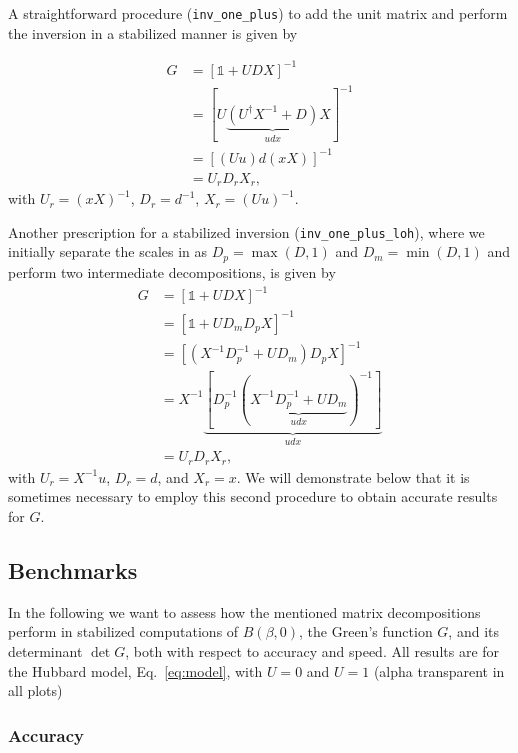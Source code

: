 \documentclass[submission, Phys]{SciPost}
\begin{document}
A straightforward procedure (\texttt{inv\_one\_plus}) to add the unit matrix and perform the inversion in a stabilized manner is given by \cite{Santos2003, Assaad2002a}

\begin{align}
	G &= [\mathbb{1} + UDX]^{-1} \nonumber \\
	&= [U\underbrace{(U^\dagger X^{-1} + D)}_{udx}X]^{-1} \nonumber\\
	&= [(Uu)d(xX)]^{-1} \label{eq:inversion}\\
	&= U_r D_r X_r \nonumber,
\end{align}
with $U_r = (xX)^{-1}$, $D_r = d^{-1}$, $X_r = (Uu)^{-1}$.

Another prescription for a stabilized inversion (\texttt{inv\_one\_plus\_loh}), where we initially separate the scales in as $D_p = \max(D, 1)$ and $D_m = \min(D, 1)$ and perform two intermediate decompositions, is given by \cite{Loh2005, Loh1989}
\begin{align}
	G &= [\mathbb{1} + UDX]^{-1} \nonumber\\
	&= [\mathbb{1} + UD_mD_pX]^{-1} \nonumber\\
	&= [(X^{-1} D_p^{-1} + U D_m) D_p X]^{-1} \label{eq:inversion_loh} \\
	&= X^{-1} \underbrace{[D_p^{-1} (\underbrace{X^{-1} D_p^{-1} + UD_m}_{udx})^{-1}]}_{udx} \nonumber \\
	&= U_r D_r X_r, \nonumber
\end{align}
with $U_r = X^{-1}u$, $D_r = d$, and $X_r = x$. We will demonstrate below that it is sometimes necessary to employ this second procedure to obtain accurate results for $G$.\\

\subsection{Benchmarks}\label{sec:benchmarks}

In the following we want to assess how the mentioned matrix decompositions perform in stabilized computations of $B(\beta, 0)$, the Green's function $G$, and its determinant $\det G$, both with respect to accuracy and speed. All results are for the Hubbard model, Eq.~\ref{eq:model}, with $U=0$ and $U=1$ (alpha transparent in all plots)

\subsubsection{Accuracy}
\end{document}
